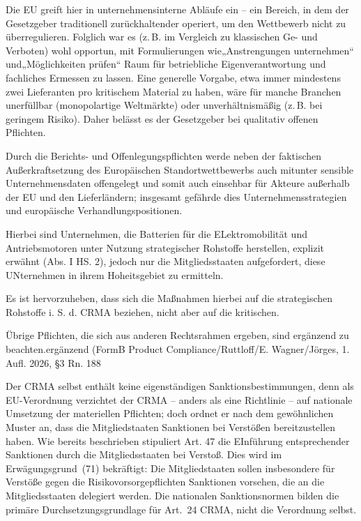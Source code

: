 \documentclass[12pt,a4paper,oneside]{book} %
\begin{document}
Die EU greift hier in unternehmensinterne Abläufe ein – ein Bereich, in dem der Gesetzgeber traditionell zurückhaltender operiert, um den Wettbewerb nicht zu überregulieren. Folglich war es (z. B. im Vergleich zu klassischen Ge- und Verboten) wohl opportun, mit Formulierungen wie„Anstrengungen unternehmen“ und„Möglichkeiten prüfen“ Raum für betriebliche Eigenverantwortung und fachliches Ermessen zu lassen. Eine generelle Vorgabe, etwa immer mindestens zwei Lieferanten pro kritischem Material zu haben, wäre für manche Branchen unerfüllbar (monopolartige Weltmärkte) oder unverhältnismäßig (z. B. bei geringem Risiko). Daher belässt es der Gesetzgeber bei qualitativ offenen Pflichten.

Durch die Berichts- und Offenlegungspflichten werde neben der faktischen Außerkraftsetzung des Europäischen Standortwettbewerbs auch mitunter sensible Unternehmensdaten offengelegt und somit auch einsehbar für Akteure außerhalb der EU und den Lieferländern; insgesamt gefährde dies Unternehmensstrategien und europäische Verhandlungspositionen.\autocite{Frenz 2025, S. 1099} 

Hierbei sind Unternehmen, die Batterien für die ELektromobilität und Antriebsmotoren unter Nutzung strategischer Rohstoffe herstellen, explizit erwähnt (Abs. I HS. 2), jedoch nur die Mitgliedsstaaten aufgefordert, diese UNternehmen in ihrem Hoheitsgebiet zu ermitteln.

Es ist hervorzuheben, dass sich die Maßnahmen hierbei auf die strategischen Rohstoffe i. S. d. CRMA beziehen, nicht aber auf die kritischen.

Übrige Pflichten, die sich aus anderen Rechtsrahmen ergeben, sind ergänzend zu beachten.\autocites{Schäffer/Hach ZRP 2023, 207 (208).}{ergänzend (FormB Product Compliance/Ruttloff/E. Wagner/Jörges, 1. Aufl. 2026, §3 Rn. 188}

Der CRMA selbst enthält keine eigenständigen Sanktionsbestimmungen, denn als EU-Verordnung verzichtet der CRMA – anders als eine Richtlinie – auf nationale Umsetzung der materiellen Pflichten; doch ordnet er nach dem gewöhnlichen Muster an, dass die Mitgliedstaaten Sanktionen bei Verstößen bereitzustellen haben. Wie bereits beschrieben stipuliert Art. 47 die EInführung entsprechender Sanktionen durch die Mitgliedsstaaten bei Verstoß. Dies wird im Erwägungsgrund (71) bekräftigt: Die Mitgliedstaaten sollen insbesondere für Verstöße gegen die Risikovorsorgepflichten Sanktionen vorsehen, die an die Mitgliedsstaaten delegiert werden. Die nationalen Sanktionsnormen bilden die primäre Durchsetzungsgrundlage für Art. 24 CRMA, nicht die Verordnung selbst.
\end{document}
